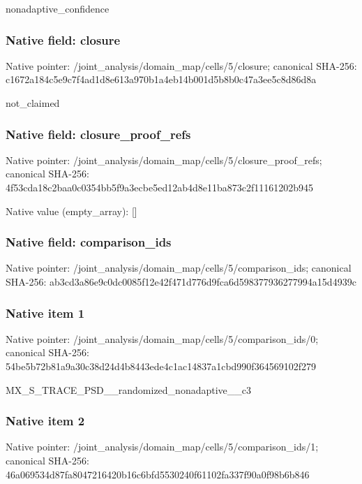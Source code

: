 \documentclass[10pt,a4paper]{article}
\begin{document}
\begingroup\raggedright\sloppy nonadaptive\_\allowbreak{}confidence\par\endgroup

\subsubsection{Native field: closure}
Native pointer: /joint\_\allowbreak{}analysis/domain\_\allowbreak{}map/cells/5/closure; canonical SHA-256: c1672a184c5e9c7f4ad1d8e613a970b1a4eb14b001d5b8b0c47a3ee5c8d86d8a

\begingroup\raggedright\sloppy not\_\allowbreak{}claimed\par\endgroup

\subsubsection{Native field: closure\_\allowbreak{}proof\_\allowbreak{}refs}
Native pointer: /joint\_\allowbreak{}analysis/domain\_\allowbreak{}map/cells/5/closure\_\allowbreak{}proof\_\allowbreak{}refs; canonical SHA-256: 4f53cda18c2baa0c0354bb5f9a3ecbe5ed12ab4d8e11ba873c2f11161202b945

Native value (empty\_\allowbreak{}array): []

\subsubsection{Native field: comparison\_\allowbreak{}ids}
Native pointer: /joint\_\allowbreak{}analysis/domain\_\allowbreak{}map/cells/5/comparison\_\allowbreak{}ids; canonical SHA-256: ab3cd3a86e9c0dc0085f12e42f471d776d9fca6d598377936277994a15d4939c

\subsubsection{Native item 1}
Native pointer: /joint\_\allowbreak{}analysis/domain\_\allowbreak{}map/cells/5/comparison\_\allowbreak{}ids/0; canonical SHA-256: 54be5b72b81a9a30c38d24d4b8443ede4c1ac14837a1cbd990f364569102f279

\begingroup\raggedright\sloppy MX\_\allowbreak{}S\_\allowbreak{}TRACE\_\allowbreak{}PSD\_\allowbreak{}\_\allowbreak{}randomized\_\allowbreak{}nonadaptive\_\allowbreak{}\_\allowbreak{}c3\par\endgroup

\subsubsection{Native item 2}
Native pointer: /joint\_\allowbreak{}analysis/domain\_\allowbreak{}map/cells/5/comparison\_\allowbreak{}ids/1; canonical SHA-256: 46a069534d87fa8047216420b16c6bfd5530240f61102fa337f90a0f98b6b846
\end{document}
